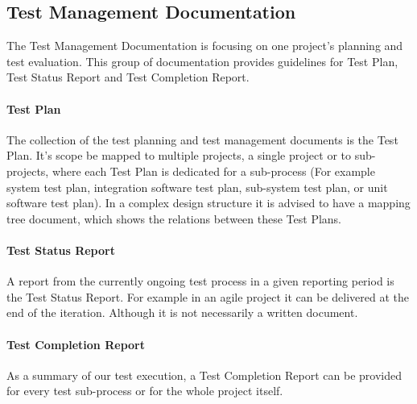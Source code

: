 \subsection{Test Management Documentation}
The Test Management Documentation is focusing on one project's planning and test evaluation. This group of documentation provides guidelines for Test Plan, Test Status Report and Test Completion Report.

\paragraph{Test Plan}
The collection of the test planning and test management documents is the Test Plan. It's scope be mapped to multiple projects, a single project or to sub-projects, where each Test Plan is dedicated for a sub-process (For example system test plan, integration software test plan, sub-system test plan, or unit software test plan). In a complex design structure it is advised to have a mapping tree document, which shows the relations between these Test Plans.

\paragraph{Test Status Report}
A report from the currently ongoing test process in a given reporting period is the Test Status Report. For example in an agile project it can be delivered at the end of the iteration. Although it is not necessarily a written document.

\paragraph{Test Completion Report}
As a summary of our test execution, a Test Completion Report can be provided for every test sub-process or for the whole project itself.

